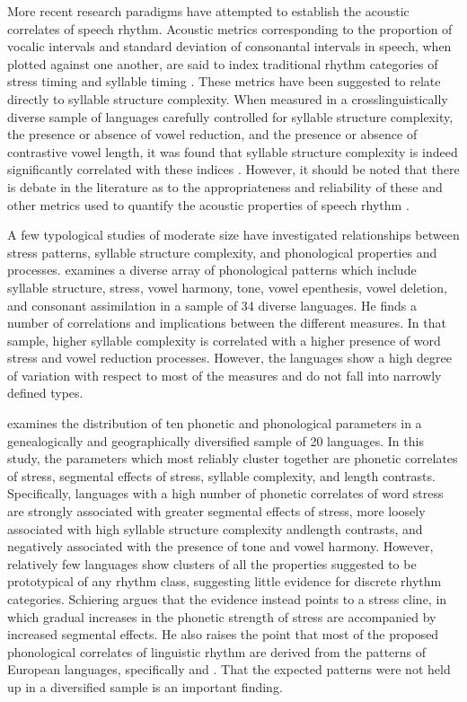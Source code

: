   More recent research paradigms have attempted to establish the acoustic correlates of speech rhythm. Acoustic metrics corresponding to the proportion of vocalic intervals and standard deviation of consonantal intervals in speech, when plotted against one another, are said to index traditional rhythm categories of stress timing and syllable timing \citep{RamusEtAl1999}. These metrics have been suggested to relate directly to syllable structure complexity. When measured in a crosslinguistically diverse sample of languages carefully controlled for syllable structure complexity, the presence or absence of vowel reduction, and the presence or absence of contrastive vowel length, it was found that syllable structure complexity is indeed significantly correlated with these indices \citep{EasterdayEtAl2011}. However, it should be noted that there is debate in the literature as to the appropriateness and reliability of these and other metrics used to quantify the acoustic properties of speech rhythm \citep{WigetEtAl2010}.

  A few typological studies of moderate size have investigated relationships between stress patterns, syllable structure complexity, and phonological properties and processes. \citet{Auer1993} examines a diverse array of phonological patterns which include syllable structure, stress, vowel harmony, tone, vowel epenthesis, vowel deletion, and consonant assimilation in a sample of 34 diverse languages. He finds a number of correlations and implications between the different measures. In that sample, higher syllable complexity is correlated with a higher presence of word stress and vowel reduction processes. However, the languages show a high degree of variation with respect to most of the measures and do not fall into narrowly defined types. 

  \citet{Schiering2007} examines the distribution of ten phonetic and phonological parameters in a genealogically and geographically diversified sample of 20 languages. In this study, the parameters which most reliably cluster together are phonetic correlates of stress, segmental effects of stress, syllable complexity, and length contrasts. Specifically, languages with a high number of phonetic correlates of word stress are strongly associated with greater segmental effects of stress, more loosely associated with high syllable structure complexity and\linebreak length contrasts, and negatively associated with the presence of tone and vowel harmony. However, relatively few languages show clusters of all the properties suggested to be prototypical of any rhythm class, suggesting little evidence for discrete rhythm categories. Schiering argues that the evidence instead points to a stress cline, in which gradual increases in the phonetic strength of stress are accompanied by increased segmental effects. He also raises the point that most of the proposed phonological correlates of linguistic rhythm are derived from the patterns of European languages, specifically  and . That the expected patterns were not held up in a diversified sample is an important finding.

